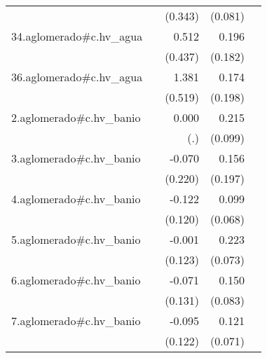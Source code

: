 {\begin{longtable}{l*{4}{D{.}{.}{-1}}}
            &                     &     (0.343)         &     (0.081)         &                     \\
\addlinespace
34.aglomerado#c.hv\_agua&                     &       0.512         &       0.196         &                     \\
            &                     &     (0.437)         &     (0.182)         &                     \\
\addlinespace
36.aglomerado#c.hv\_agua&                     &       1.381\sym{**} &       0.174         &                     \\
            &                     &     (0.519)         &     (0.198)         &                     \\
\addlinespace
2.aglomerado#c.hv\_banio&                     &       0.000         &       0.215\sym{*}  &                     \\
            &                     &         (.)         &     (0.099)         &                     \\
\addlinespace
3.aglomerado#c.hv\_banio&                     &      -0.070         &       0.156         &                     \\
            &                     &     (0.220)         &     (0.197)         &                     \\
\addlinespace
4.aglomerado#c.hv\_banio&                     &      -0.122         &       0.099         &                     \\
            &                     &     (0.120)         &     (0.068)         &                     \\
\addlinespace
5.aglomerado#c.hv\_banio&                     &      -0.001         &       0.223\sym{**} &                     \\
            &                     &     (0.123)         &     (0.073)         &                     \\
\addlinespace
6.aglomerado#c.hv\_banio&                     &      -0.071         &       0.150         &                     \\
            &                     &     (0.131)         &     (0.083)         &                     \\
\addlinespace
7.aglomerado#c.hv\_banio&                     &      -0.095         &       0.121         &                     \\
            &                     &     (0.122)         &     (0.071)         &                     \\

\end{longtable}}
